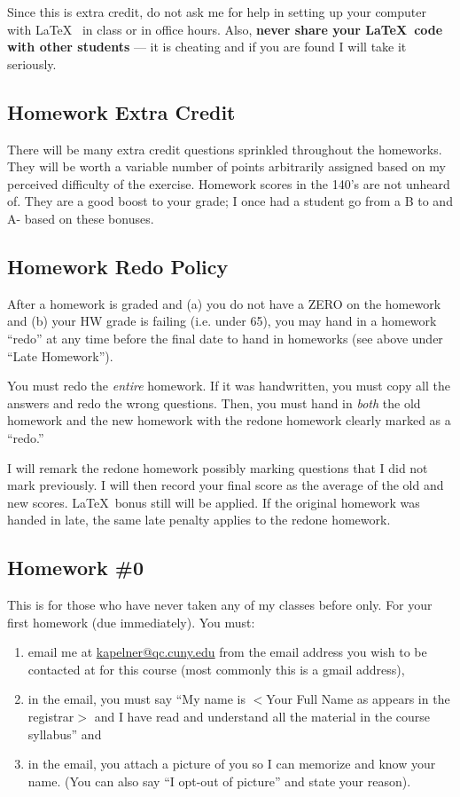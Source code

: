 \documentclass[12pt]{article}
\newcommand{\qu}[1]{``#1''}
\begin{document}
Since this is extra credit, do not ask me for help in setting up your computer with \LaTeX~ in class or in office hours. Also, \textbf{never share your \LaTeX~code with other students} --- it is cheating and if you are found I will take it seriously.

\subsection*{Homework Extra Credit}

There will be many extra credit questions sprinkled throughout the homeworks. They will be worth a variable number of points arbitrarily assigned based on my perceived difficulty of the exercise. Homework scores in the 140's are not unheard of. They are a good boost to your grade; I once had a student go from a B to and A- based on these bonuses.

\subsection*{Homework Redo Policy}

After a homework is graded and (a) you do not have a ZERO on the homework and (b) your HW grade is failing (i.e. under 65), you may hand in a homework \qu{redo} at any time before the final date to hand in homeworks (see above under \qu{Late Homework}). 

You must redo the \textit{entire} homework. If it was handwritten, you must copy all the answers and redo the wrong questions. Then, you must hand in \textit{both} the old homework and the new homework with the redone homework clearly marked as a \qu{redo.}

I will remark the redone homework possibly marking questions that I did not mark previously. I will then record your final score as the average of the old and new scores. \LaTeX~bonus still will be applied. If the original homework was handed in late, the same late penalty applies to the redone homework.

\subsection*{Homework \#0}

This is for those who have never taken any of my classes before only. For your first homework (due immediately). You must:

\begin{enumerate}[(1)]
\item email me at \href{kapelner@qc.cuny.edu}{kapelner@qc.cuny.edu} from the email address you wish to be contacted at for this course (most commonly this is a gmail address),
\item in the email, you must say \qu{My name is $<$Your Full Name as appears in the registrar$>$ and I have read and understand all the material in the course syllabus} and
\item in the email, you attach a picture of you so I can memorize and know your name. (You can also say \qu{I opt-out of picture} and state your reason).
\end{enumerate}
\end{document}
